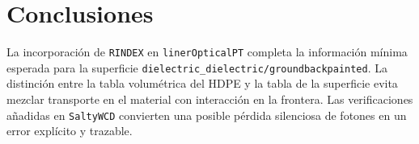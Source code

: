 \documentclass[11pt,a4paper]{article}
\newcommand{\codigo}[1]{\nolinkurl{#1}}
\begin{document}
\section{Conclusiones}

La incorporación de \codigo{RINDEX} en \codigo{linerOpticalPT} completa la
información mínima esperada para la superficie
\codigo{dielectric_dielectric/groundbackpainted}. La distinción entre la tabla
volumétrica del HDPE y la tabla de la superficie evita mezclar transporte en el
material con interacción en la frontera. Las verificaciones añadidas en
\codigo{SaltyWCD} convierten una posible pérdida silenciosa de fotones en un
error explícito y trazable.
\end{document}
